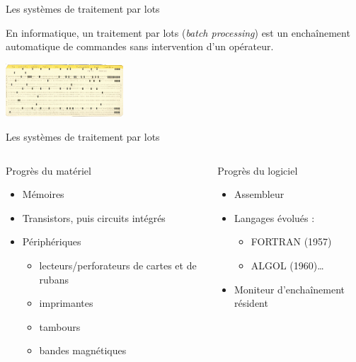 \begin{frame}{Les systèmes de traitement par lots}
\begin{definition}
En informatique, un traitement par lots (\emph{batch processing}) est
un enchaînement automatique de commandes sans intervention d'un opérateur.
\end{definition}
\includegraphics[height=2cm]{../illustration/carte_jcl.png}
\end{frame}


\begin{frame}{Les systèmes de traitement par lots}
\begin{columns}
\begin{block}{Progrès du matériel}
\begin{itemize}
\item Mémoires
\item Transistors, puis circuits intégrés
\item Périphériques
\begin{itemize}
\item lecteurs/perforateurs de cartes et de rubans
\item imprimantes
\item tambours
\item bandes magnétiques
\end{itemize}
\end{itemize}
\end{block}
\begin{block}{Progrès du logiciel}
\begin{itemize}
\item Assembleur
\item Langages évolués :
\begin{itemize}
\item FORTRAN (1957)
\item ALGOL (1960)…
\end{itemize}
\item Moniteur d’enchaînement résident
\end{itemize}
\end{block}
\end{columns}
\end{frame}

